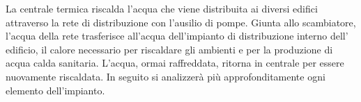 \documentclass[laurea,oneside,11pt]{USiena_tesiLM}
\begin{document}
La centrale termica riscalda l'acqua che viene distribuita ai diversi edifici attraverso la rete di distribuzione con l'ausilio di pompe. Giunta allo scambiatore, l'acqua della rete trasferisce all'acqua dell'impianto di distribuzione interno dell' edificio, il calore necessario per riscaldare gli ambienti e per la produzione di acqua calda sanitaria. L'acqua, ormai raffreddata, ritorna in centrale per essere nuovamente riscaldata. 
In seguito si analizzerà più approfonditamente ogni elemento dell'impianto.
\end{document}
